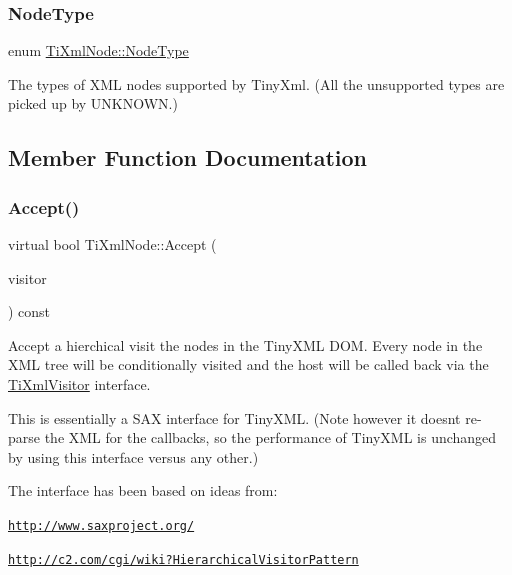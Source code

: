 \subsubsection{\texorpdfstring{Node\+Type}{NodeType}}
{\footnotesize\ttfamily enum \hyperlink{class_ti_xml_node_a836eded4920ab9e9ef28496f48cd95a2}{Ti\+Xml\+Node\+::\+Node\+Type}}

The types of X\+ML nodes supported by Tiny\+Xml. (All the unsupported types are picked up by U\+N\+K\+N\+O\+WN.) 

\subsection{Member Function Documentation}
\mbox{\label{class_ti_xml_node_acc0f88b7462c6cb73809d410a4f5bb86}} 
\subsubsection{\texorpdfstring{Accept()}{Accept()}}
{\footnotesize\ttfamily virtual bool Ti\+Xml\+Node\+::\+Accept (\begin{DoxyParamCaption}\item[{\hyperlink{class_ti_xml_visitor}{Ti\+Xml\+Visitor} $\ast$}]{visitor }\end{DoxyParamCaption}) const\hspace{0.3cm}{\ttfamily [pure virtual]}}

Accept a hierchical visit the nodes in the Tiny\+X\+ML D\+OM. Every node in the X\+ML tree will be conditionally visited and the host will be called back via the \hyperlink{class_ti_xml_visitor}{Ti\+Xml\+Visitor} interface.

This is essentially a S\+AX interface for Tiny\+X\+ML. (Note however it doesn\textquotesingle{}t re-\/parse the X\+ML for the callbacks, so the performance of Tiny\+X\+ML is unchanged by using this interface versus any other.)

The interface has been based on ideas from\+:


\begin{DoxyItemize}
\item \href{http://www.saxproject.org/}{\tt http\+://www.\+saxproject.\+org/}
\item \href{http://c2.com/cgi/wiki?HierarchicalVisitorPattern}{\tt http\+://c2.\+com/cgi/wiki?\+Hierarchical\+Visitor\+Pattern}
\end{DoxyItemize}


